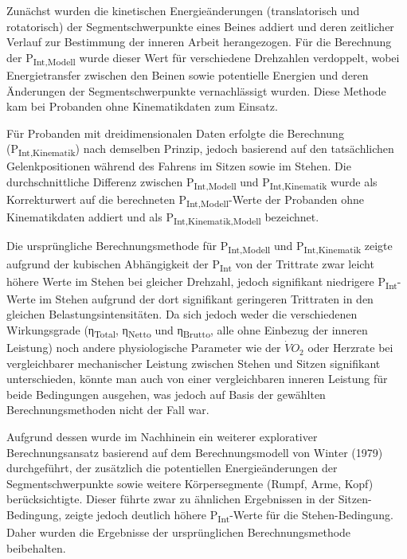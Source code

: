 \documentclass[
  letterpaper,
  DIV=11]{scrartcl}
\begin{document}
Zunächst wurden die kinetischen Energieänderungen (translatorisch und
rotatorisch) der Segmentschwerpunkte eines Beines addiert und deren
zeitlicher Verlauf zur Bestimmung der inneren Arbeit herangezogen. Für
die Berechnung der P\textsubscript{Int,Modell} wurde dieser Wert für
verschiedene Drehzahlen verdoppelt, wobei Energietransfer zwischen den
Beinen sowie potentielle Energien und deren Änderungen der
Segmentschwerpunkte vernachlässigt wurden. Diese Methode kam bei
Probanden ohne Kinematikdaten zum Einsatz.

Für Probanden mit dreidimensionalen Daten erfolgte die Berechnung
(P\textsubscript{Int,Kinematik}) nach demselben Prinzip, jedoch
basierend auf den tatsächlichen Gelenkpositionen während des Fahrens im
Sitzen sowie im Stehen. Die durchschnittliche Differenz zwischen
P\textsubscript{Int,Modell} und P\textsubscript{Int,Kinematik} wurde als
Korrekturwert auf die berechneten P\textsubscript{Int,Modell}-Werte der
Probanden ohne Kinematikdaten addiert und als
P\textsubscript{Int,Kinematik,Modell} bezeichnet.

Die ursprüngliche Berechnungsmethode für P\textsubscript{Int,Modell} und
P\textsubscript{Int,Kinematik} zeigte aufgrund der kubischen
Abhängigkeit der P\textsubscript{Int} von der Trittrate zwar leicht
höhere Werte im Stehen bei gleicher Drehzahl, jedoch signifikant
niedrigere P\textsubscript{Int}-Werte im Stehen aufgrund der dort
signifikant geringeren Trittraten in den gleichen
Belastungsintensitäten. Da sich jedoch weder die verschiedenen
Wirkungsgrade (η\textsubscript{Total}, η\textsubscript{Netto} und
η\textsubscript{Brutto}, alle ohne Einbezug der inneren Leistung) noch
andere physiologische Parameter wie der \(\dot{V}O_2\) oder Herzrate bei
vergleichbarer mechanischer Leistung zwischen Stehen und Sitzen
signifikant unterschieden, könnte man auch von einer vergleichbaren
inneren Leistung für beide Bedingungen ausgehen, was jedoch auf Basis
der gewählten Berechnungsmethoden nicht der Fall war.

Aufgrund dessen wurde im Nachhinein ein weiterer explorativer
Berechnungsansatz basierend auf dem Berechnungsmodell von Winter (1979)
durchgeführt, der zusätzlich die potentiellen Energieänderungen der
Segmentschwerpunkte sowie weitere Körpersegmente (Rumpf, Arme, Kopf)
berücksichtigte. Dieser führte zwar zu ähnlichen Ergebnissen in der
Sitzen-Bedingung, zeigte jedoch deutlich höhere
P\textsubscript{Int}-Werte für die Stehen-Bedingung. Daher wurden die
Ergebnisse der ursprünglichen Berechnungsmethode beibehalten.
\end{document}
